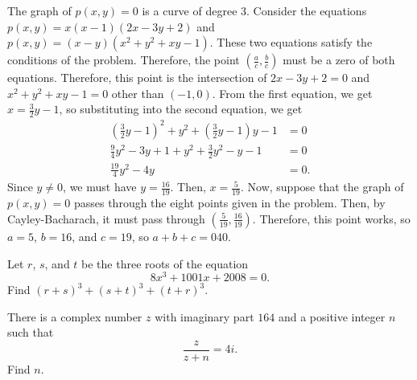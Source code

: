 \begin{solution}[name={Solution by DottedCalculator}]
	The graph of $p(x,y)=0$ is a curve of degree $3$. Consider the equations $p(x,y)=x(x-1)(2x-3y+2)$ and $p(x,y)=(x-y)(x^2+y^2+xy-1)$. These two equations satisfy the conditions of the problem. Therefore, the point $\left(\frac ac,\frac bc\right)$ must be a zero of both equations. Therefore, this point is the intersection of $2x-3y+2=0$ and $x^2+y^2+xy-1=0$ other than $(-1,0)$. From the first equation, we get $x=\frac32y-1$, so substituting into the second equation, we get
	\begin{align*}
		\left(\frac32y-1\right)^2+y^2+\left(\frac32y-1\right)y-1&=0\\
		\frac94y^2-3y+1+y^2+\frac32y^2-y-1&=0\\
		\frac{19}4y^2-4y&=0.\end{align*}Since $y\neq0$, we must have $y=\frac{16}{19}$. Then, $x=\frac5{19}$.
	Now, suppose that the graph of $p(x,y)=0$ passes through the eight points given in the problem. Then, by Cayley-Bacharach, it must pass through $\left(\frac5{19},\frac{16}{19}\right)$. Therefore, this point works, so $a=5$, $b=16$, and $c=19$, so $a+b+c=\boxed{040}$.
\end{solution}






\begin{question}[name={2008 AIME II, \href{https://artofproblemsolving.com/community/c4p1088467}{Problem 7}}]
	Let $ r$, $ s$, and $ t$ be the three roots of the equation
	\[ 8x^3+1001x+2008=0.\]Find $ (r+s)^3+(s+t)^3+(t+r)^3$.
\end{question}


%	













\begin{question}[name={2009 AIME I, \href{https://artofproblemsolving.com/community/c4p1439403}{Problem 2}}]
	There is a complex number $ z$ with imaginary part $ 164$ and a positive integer $ n$ such that
	\[ \frac {z}{z + n} = 4i.
	\]Find $ n$.
\end{question}


%	









